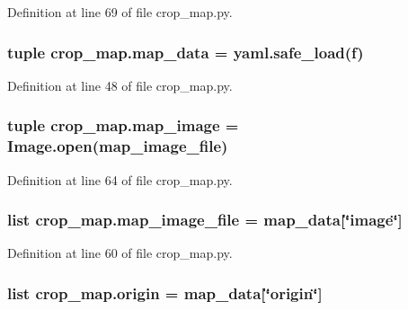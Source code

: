 Definition at line 69 of file crop\-\_\-map.\-py.

\hypertarget{namespacecrop__map_af86edf3ccdfff41391f99efc69d2d4da}{
\subsubsection[{map\-\_\-data}]{\setlength{\rightskip}{0pt plus 5cm}tuple crop\-\_\-map.\-map\-\_\-data = yaml.\-safe\-\_\-load(f)}}\label{namespacecrop__map_af86edf3ccdfff41391f99efc69d2d4da}


Definition at line 48 of file crop\-\_\-map.\-py.

\hypertarget{namespacecrop__map_afd633be1a08796a6cf51525ffe2c798c}{
\subsubsection[{map\-\_\-image}]{\setlength{\rightskip}{0pt plus 5cm}tuple crop\-\_\-map.\-map\-\_\-image = Image.\-open({\bf map\-\_\-image\-\_\-file})}}\label{namespacecrop__map_afd633be1a08796a6cf51525ffe2c798c}


Definition at line 64 of file crop\-\_\-map.\-py.

\hypertarget{namespacecrop__map_af48d47a4bef471975d0ec5c45897b900}{
\subsubsection[{map\-\_\-image\-\_\-file}]{\setlength{\rightskip}{0pt plus 5cm}list crop\-\_\-map.\-map\-\_\-image\-\_\-file = {\bf map\-\_\-data}\mbox{[}\char`\"{}image\char`\"{}\mbox{]}}}\label{namespacecrop__map_af48d47a4bef471975d0ec5c45897b900}


Definition at line 60 of file crop\-\_\-map.\-py.

\hypertarget{namespacecrop__map_a4cc67daeadf848702b238b211698dd8a}{
\subsubsection[{origin}]{\setlength{\rightskip}{0pt plus 5cm}list crop\-\_\-map.\-origin = {\bf map\-\_\-data}\mbox{[}\char`\"{}origin\char`\"{}\mbox{]}}}\label{namespacecrop__map_a4cc67daeadf848702b238b211698dd8a}



